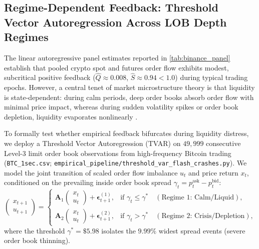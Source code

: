 \documentclass[10pt,twocolumn,letterpaper]{article}
\theoremstyle{definition}
\theoremstyle{remark}
\begin{document}
\subsection{Regime-Dependent Feedback: Threshold Vector Autoregression Across LOB Depth Regimes}
\label{sec:tvar_flash_crashes}
The linear autoregressive panel estimates reported in \cref{tab:binance_panel} establish that pooled crypto spot and futures order flow exhibits modest, subcritical positive feedback ($\hat Q \approx 0.008$, $\hat S \approx 0.94 < 1.0$) during typical trading epochs. However, a central tenet of market microstructure theory is that liquidity is state-dependent: during calm periods, deep order books absorb order flow with minimal price impact, whereas during sudden volatility spikes or order book depletion, liquidity evaporates nonlinearly \citep{almgren2000,brunnermeier2009}.

To formally test whether empirical feedback bifurcates during liquidity distress, we deploy a Threshold Vector Autoregression (TVAR) on $49{,}999$ consecutive Level-3 limit order book observations from high-frequency Bitcoin trading (\texttt{BTC\_1sec.csv}; \texttt{empirical\_pipeline/threshold\_var\_flash\_crashes.py}). We model the joint transition of scaled order flow imbalance $u_t$ and price return $x_t$, conditioned on the prevailing inside order book spread $\gamma_t = p_t^{\text{ask}} - p_t^{\text{bid}}$:
\begin{equation}
\begin{pmatrix} x_{t+1} \\ u_{t+1} \end{pmatrix} = \begin{cases} 
\mathbf{A}_1 \begin{pmatrix} x_t \\ u_t \end{pmatrix} + \boldsymbol{\epsilon}_{t+1}^{(1)}, & \text{if } \gamma_t \le \gamma^* \quad (\text{Regime 1: Calm/Liquid}), \\[8pt]
\mathbf{A}_2 \begin{pmatrix} x_t \\ u_t \end{pmatrix} + \boldsymbol{\epsilon}_{t+1}^{(2)}, & \text{if } \gamma_t > \gamma^* \quad (\text{Regime 2: Crisis/Depletion}),
\end{cases}
\end{equation}
where the threshold $\gamma^* = \$5.98$ isolates the $9.99\%$ widest spread events (severe order book thinning).
\end{document}
